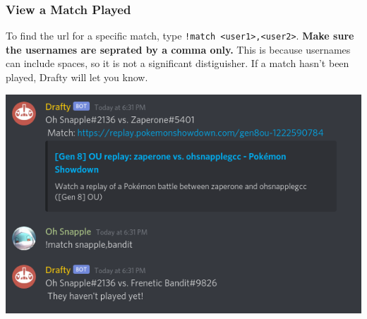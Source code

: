 \documentclass{article}
\begin{document}
\subsubsection*{View a Match Played}
To find the url for a specific match, type \verb|!match <user1>,<user2>|. \textbf{Make sure the usernames are seprated by a comma only.} 
This is because usernames can include spaces, so it is not a significant distiguisher. If a match hasn't been played, Drafty will let you know.\\
\begin{center}
  \includegraphics[scale=.5]{match_played.png}
\end{center}
\newpage
\end{document}
